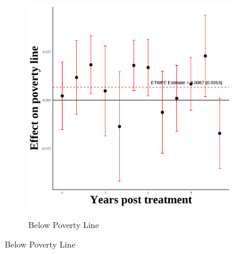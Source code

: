 \documentclass[12pt,english]{article}
\begin{document}
\begin{figure}[H]
\begin{subfigure}[b]{0.3\textwidth}
    \label{fig:snap-third-four}
  \end{subfigure}
  \hfill
  \begin{subfigure}[b]{0.3\textwidth}
    \centering
    \caption{Below Poverty Line}
    \includegraphics[width=\linewidth]{figures/plot86-poverty_line_event_study-third-four.png}
    \label{fig:poverty-line-third-four}
  \end{subfigure}

  \vspace{0.3cm} %


\end{figure}
\end{document}

